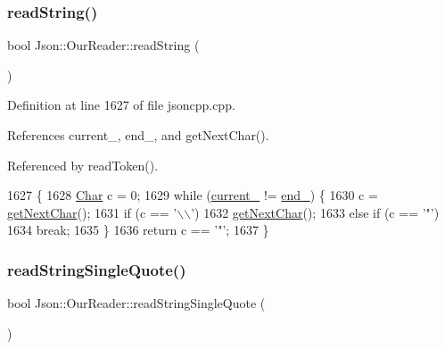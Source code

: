 \subsubsection{\texorpdfstring{read\+String()}{readString()}}
{\footnotesize\ttfamily bool Json\+::\+Our\+Reader\+::read\+String (\begin{DoxyParamCaption}{ }\end{DoxyParamCaption})\hspace{0.3cm}{\ttfamily [private]}}



Definition at line 1627 of file jsoncpp.\+cpp.



References current\+\_\+, end\+\_\+, and get\+Next\+Char().



Referenced by read\+Token().


\begin{DoxyCode}
1627                            \{
1628   \hyperlink{class_json_1_1_our_reader_a0cd0bab4caa66594ab843ccd5f9dc239}{Char} c = 0;
1629   \textcolor{keywordflow}{while} (\hyperlink{class_json_1_1_our_reader_a5211fbbba94be80a22dd2317c621efcc}{current\_} != \hyperlink{class_json_1_1_our_reader_ab1f69b0260c27a0d2d65dc56e42c8f9d}{end\_}) \{
1630     c = \hyperlink{class_json_1_1_our_reader_a298285d035fdbc554caae09d9f0a5859}{getNextChar}();
1631     \textcolor{keywordflow}{if} (c == \textcolor{charliteral}{'\(\backslash\)\(\backslash\)'})
1632       \hyperlink{class_json_1_1_our_reader_a298285d035fdbc554caae09d9f0a5859}{getNextChar}();
1633     \textcolor{keywordflow}{else} \textcolor{keywordflow}{if} (c == \textcolor{charliteral}{'"'})
1634       \textcolor{keywordflow}{break};
1635   \}
1636   \textcolor{keywordflow}{return} c == \textcolor{charliteral}{'"'};
1637 \}
\end{DoxyCode}
\mbox{\label{class_json_1_1_our_reader_ac78592defdc333faf56c6d0908758da3}} 
\subsubsection{\texorpdfstring{read\+String\+Single\+Quote()}{readStringSingleQuote()}}
{\footnotesize\ttfamily bool Json\+::\+Our\+Reader\+::read\+String\+Single\+Quote (\begin{DoxyParamCaption}{ }\end{DoxyParamCaption})\hspace{0.3cm}{\ttfamily [private]}}



